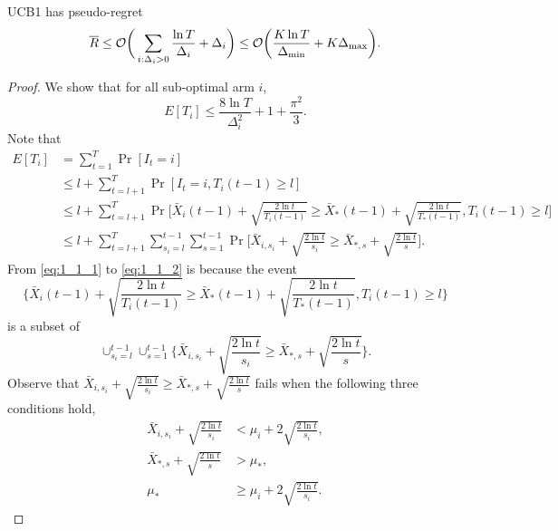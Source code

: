 \begin{thm}
    UCB1 has pseudo-regret
    \begin{equation}
        {\overline{R}} \le \mathcal{O}\bigg(\sum_{i:\Delta_i>0} \frac{\ln T}{\Delta_i}+\Delta_i\bigg)
            \le \mathcal{O}\bigg(\frac{K\ln T}{\Delta_\text{min}}+K\Delta_\text{max}\bigg).
    \end{equation}
\end{thm}
\begin{proof}
    We show that for all sub-optimal arm $i$,
    \begin{equation}
        E[T_i] \le \frac{8\ln T}{\Delta_i^2} + 1 + \frac{\pi^2}{3}.
    \end{equation}
    Note that
    \begin{align}
        E[T_i]
            &= \sum_{t=1}^T \Pr[I_t=i] \\
            &\le l + \sum_{t=l+1}^T \Pr[I_t=i, T_i(t-1)\ge l] \\
            &\le l + \sum_{t=l+1}^T \Pr\Bigg[\bar X_{i}(t-1) +
                \sqrt{\frac{2\ln t}{T_i(t-1)}}\ge \bar X_{*}(t-1)+
                \sqrt{\frac{2\ln t}{T_{*}(t-1)}}, T_i(t-1)\ge l\Bigg] \label{eq:1_1_1}\\
            &\le l + \sum_{t=l+1}^T \sum_{s_i=l}^{t-1} \sum_{s=1}^{t-1}
                \Pr\Bigg[\bar X_{i,s_i} + \sqrt{\frac{2\ln t}{s_i}}\ge
                \bar X_{*,s}+\sqrt{\frac{2\ln t}{s}}\Bigg]. \label{eq:1_1_2}
    \end{align}
    From \eqref{eq:1_1_1} to \eqref{eq:1_1_2} is because the event
    \begin{equation}
        \Bigg\{\bar X_{i}(t-1) + \sqrt{\frac{2\ln t}{T_i(t-1)}}\ge
        \bar X_{*}(t-1)+\sqrt{\frac{2\ln t}{T_{*}(t-1)}}, T_i(t-1)\ge l\Bigg\}
    \end{equation}
    is a subset of
    \begin{equation}
        \cup_{s_i=l}^{t-1} \cup_{s=1}^{t-1}\Bigg\{\bar X_{i,s_i} + \sqrt{\frac{2\ln t}{s_i}}\ge
        \bar X_{*,s}+\sqrt{\frac{2\ln t}{s}}\Bigg\}.
    \end{equation}
    Observe that $\bar X_{i,s_i} + \sqrt{\frac{2\ln t}{s_i}}\ge\bar X_{*,s}+\sqrt{\frac{2\ln t}{s}}$
    fails when the following three conditions hold,
    \begin{align}
        \bar X_{i,s_i} + \sqrt{\frac{2\ln t}{s_i}} &< \mu_i + 2\sqrt{\frac{2\ln t}{s_i}}, \label{eq:1_2} \\
        \bar X_{*,s} + \sqrt{\frac{2\ln t}{s}} &> \mu_*,  \\
        \mu_* &\ge \mu_i + 2\sqrt{\frac{2\ln t}{s_i}}. \label{eq:1_3}

\end{align}
\end{proof}
